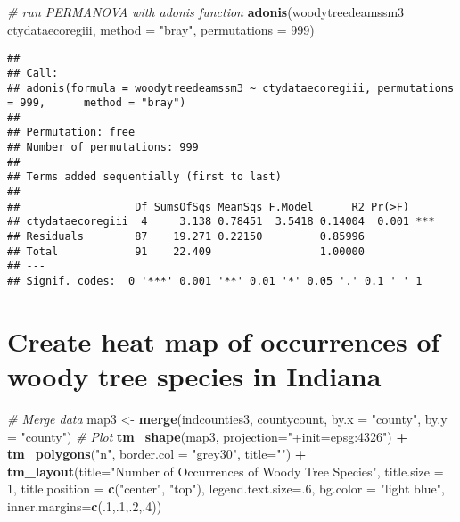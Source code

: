 \documentclass[
]{article}
\newenvironment{Shaded}{\begin{snugshade}}{\end{snugshade}}
\newcommand{\CommentTok}[1]{\textcolor[rgb]{0.56,0.35,0.01}{\textit{#1}}}
\newcommand{\DataTypeTok}[1]{\textcolor[rgb]{0.13,0.29,0.53}{#1}}
\newcommand{\DecValTok}[1]{\textcolor[rgb]{0.00,0.00,0.81}{#1}}
\newcommand{\KeywordTok}[1]{\textcolor[rgb]{0.13,0.29,0.53}{\textbf{#1}}}
\newcommand{\NormalTok}[1]{#1}
\newcommand{\OperatorTok}[1]{\textcolor[rgb]{0.81,0.36,0.00}{\textbf{#1}}}
\newcommand{\StringTok}[1]{\textcolor[rgb]{0.31,0.60,0.02}{#1}}
\begin{document}
\begin{Shaded}
\begin{Highlighting}[]
\CommentTok{# run PERMANOVA with adonis function}
\KeywordTok{adonis}\NormalTok{(woodytreedeamssm3 }\OperatorTok{~}\StringTok{ }\NormalTok{ctydataecoregiii, }\DataTypeTok{method =} \StringTok{"bray"}\NormalTok{, }\DataTypeTok{permutations =} \DecValTok{999}\NormalTok{)}
\end{Highlighting}
\end{Shaded}

\begin{verbatim}
## 
## Call:
## adonis(formula = woodytreedeamssm3 ~ ctydataecoregiii, permutations = 999,      method = "bray") 
## 
## Permutation: free
## Number of permutations: 999
## 
## Terms added sequentially (first to last)
## 
##                  Df SumsOfSqs MeanSqs F.Model      R2 Pr(>F)    
## ctydataecoregiii  4     3.138 0.78451  3.5418 0.14004  0.001 ***
## Residuals        87    19.271 0.22150         0.85996           
## Total            91    22.409                 1.00000           
## ---
## Signif. codes:  0 '***' 0.001 '**' 0.01 '*' 0.05 '.' 0.1 ' ' 1
\end{verbatim}

\hypertarget{create-heat-map-of-occurrences-of-woody-tree-species-in-indiana}{%
\section{Create heat map of occurrences of woody tree species in
Indiana}\label{create-heat-map-of-occurrences-of-woody-tree-species-in-indiana}}

\begin{Shaded}
\begin{Highlighting}[]
\CommentTok{# Merge data}
\NormalTok{map3 <-}\StringTok{ }\KeywordTok{merge}\NormalTok{(indcounties3,}
\NormalTok{                     countycount,}
                     \DataTypeTok{by.x =} \StringTok{"county"}\NormalTok{,}
                     \DataTypeTok{by.y =} \StringTok{"county"}\NormalTok{)}
\CommentTok{# Plot}
\KeywordTok{tm_shape}\NormalTok{(map3, }\DataTypeTok{projection=}\StringTok{"+init=epsg:4326"}\NormalTok{) }\OperatorTok{+}
\StringTok{  }\KeywordTok{tm_polygons}\NormalTok{(}\StringTok{"n"}\NormalTok{, }\DataTypeTok{border.col =} \StringTok{"grey30"}\NormalTok{, }\DataTypeTok{title=}\StringTok{""}\NormalTok{) }\OperatorTok{+}
\KeywordTok{tm_layout}\NormalTok{(}\DataTypeTok{title=}\StringTok{"Number of Occurrences of Woody Tree Species"}\NormalTok{, }
          \DataTypeTok{title.size =} \DecValTok{1}\NormalTok{, }
          \DataTypeTok{title.position =} \KeywordTok{c}\NormalTok{(}\StringTok{"center"}\NormalTok{, }\StringTok{"top"}\NormalTok{), }
          \DataTypeTok{legend.text.size=}\NormalTok{.}\DecValTok{6}\NormalTok{, }\DataTypeTok{bg.color =} \StringTok{"light blue"}\NormalTok{, }\DataTypeTok{inner.margins=}\KeywordTok{c}\NormalTok{(.}\DecValTok{1}\NormalTok{,.}\DecValTok{1}\NormalTok{,.}\DecValTok{2}\NormalTok{,.}\DecValTok{4}\NormalTok{))}
\end{Highlighting}
\end{Shaded}
\end{document}
